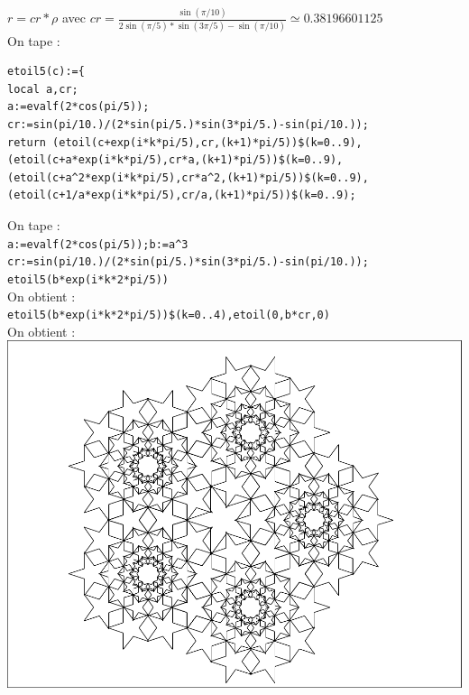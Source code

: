 \documentclass[a4paper,11pt]{book}
\begin{document}
$r=cr*\rho$ avec $\displaystyle cr=\frac{\sin(\pi/10)}{2\sin(\pi/5)*\sin(3\pi/5)-\sin(\pi/10)}\simeq 0.38196601125$\\
On tape :
\begin{verbatim}
etoil5(c):={
local a,cr;
a:=evalf(2*cos(pi/5));
cr:=sin(pi/10.)/(2*sin(pi/5.)*sin(3*pi/5.)-sin(pi/10.));
return (etoil(c+exp(i*k*pi/5),cr,(k+1)*pi/5))$(k=0..9),
(etoil(c+a*exp(i*k*pi/5),cr*a,(k+1)*pi/5))$(k=0..9),
(etoil(c+a^2*exp(i*k*pi/5),cr*a^2,(k+1)*pi/5))$(k=0..9),
(etoil(c+1/a*exp(i*k*pi/5),cr/a,(k+1)*pi/5))$(k=0..9);
\end{verbatim}
On tape :\\
{\tt a:=evalf(2*cos(pi/5));b:=a\verb|^|3}\\
{\tt cr:=sin(pi/10.)/(2*sin(pi/5.)*sin(3*pi/5.)-sin(pi/10.));}\\
{\tt etoil5(b*exp(i*k*2*pi/5))}\\
On obtient :\\
{\tt etoil5(b*exp(i*k*2*pi/5))\$(k=0..4),etoil(0,b*cr,0)}\\
On obtient :\\

\includegraphics[width=\textwidth]{casetoil}\\
\end{document}
